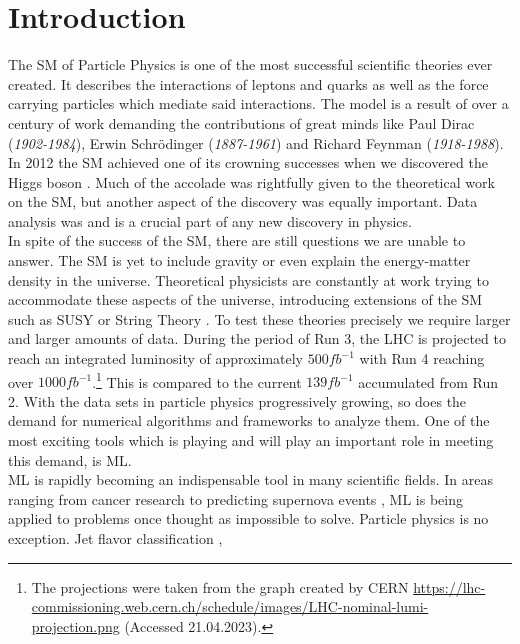 \chapter*{Introduction}
The \ac{SM} of Particle Physics is one of the most successful scientific theories ever
created. It describes the interactions of leptons and quarks as well as the force
carrying particles which mediate said interactions. The model is a result of over a century of work
demanding the contributions of great minds like Paul Dirac (\emph{1902-1984}), Erwin Schrödinger (\emph{1887-1961}) and Richard Feynman (\emph{1918-1988}).
In 2012 the \ac{SM} achieved one of its crowning successes when we discovered the Higgs boson \cite{Aad_2012,the_cms_collaboration_observation_2012}. 
Much of the accolade was rightfully given to the theoretical work on the \ac{SM}, but another aspect of the discovery 
was equally important. Data analysis was and is a crucial part of any new discovery in physics. \newline
\\
In spite of the success of the \ac{SM}, there are still questions we are unable to answer.
The \ac{SM} is yet to include gravity or even explain the energy-matter density in the universe. Theoretical 
physicists are constantly at work trying to accommodate these aspects of the universe,
introducing extensions of the \ac{SM} such as \ac{SUSY} \cite{SUSY} or String Theory \cite{cole_probing_2021}. To test these theories precisely
we require larger and larger amounts of data. During the period of Run 3, the \ac{LHC} is projected to reach an integrated luminosity of approximately  
$500fb^{-1}$ with Run 4 reaching over $1000fb^{-1}$.\footnote{The projections were taken from the graph created by CERN
\url{https://lhc-commissioning.web.cern.ch/schedule/images/LHC-nominal-lumi-projection.png}
(Accessed 21.04.2023).} This is compared to the current $139fb^{-1}$ accumulated from Run 2. With the data sets in particle physics progressively growing, 
so does the demand for numerical algorithms and frameworks to analyze them. One of the most exciting tools which is playing and will play an important role in meeting 
this demand, is \acf{ML}.\newline
\\
\ac{ML} is rapidly becoming an indispensable tool in many scientific fields.
In areas ranging from cancer research \cite{SkinCancer} to predicting supernova events \cite{moller_photometric_2016}, \ac{ML} is being applied to problems
once thought as impossible to solve. Particle physics is no exception. Jet flavor classification \cite{Guest_2016}, 

